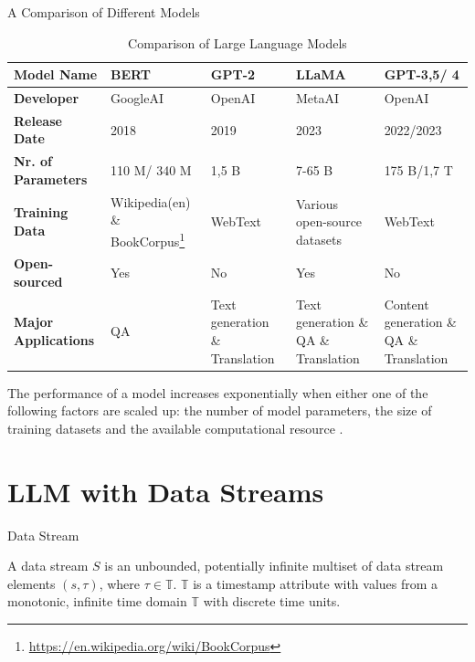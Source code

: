 \documentclass[t]{beamer}
\begin{document}
\begin{frame}{A Comparison of Different Models}
  \begin{table}[H]
    \centering
    \small
    \begin{tabular}{| p{4cm} | p{2cm} | p{2cm} | p{2cm} | p{2cm} |}
    \hline
    \textbf{Model Name} & BERT & GPT-2 & LLaMA & GPT-3,5/ 4 \\
    \hline
    \textbf{Developer} & GoogleAI & OpenAI & MetaAI & OpenAI \\
    \hline
    \textbf{Release Date} & 2018 & 2019 & 2023 & 2022/2023 \\
    \hline
    \textbf{Nr. of Parameters} & 110 M/ 340 M & 1,5 B & 7-65 B & 175 B/1,7 T \\
    \hline
    \textbf{Training Data} & Wikipedia(en) \& BookCorpus\footnote{\url{https://en.wikipedia.org/wiki/BookCorpus}} & WebText & Various open-source datasets & WebText \\
    \hline
    \textbf{Open-sourced} & Yes & No & Yes & No \\
    \hline
    \textbf{Major Applications} & QA & Text generation \& Translation & Text generation \& QA \& Translation & Content generation \& QA \& Translation \\
    \hline
    \end{tabular}
    \caption{Comparison of Large Language Models}
    \label{table:comparison}
  \end{table}
  The performance of a model increases exponentially when either one of the following factors are scaled up: 
  the number of model parameters, the size of training datasets and the available computational resource \cite{Kaplan20}.
\end{frame}

\section{LLM with Data Streams}
\begin{frame}{Data Stream}
  \vspace{1cm}
  \begin{definition}
    A data stream $S$ is an unbounded, potentially infinite multiset of data stream elements $(s,\tau)$, where $\tau \in \mathbb{T}$.
     $\mathbb{T}$ is a timestamp attribute with values from a monotonic, infinite time domain $\mathbb{T}$ with discrete time units. \cite{Geisler13}
  \end{definition}
\end{frame}
\end{document}
